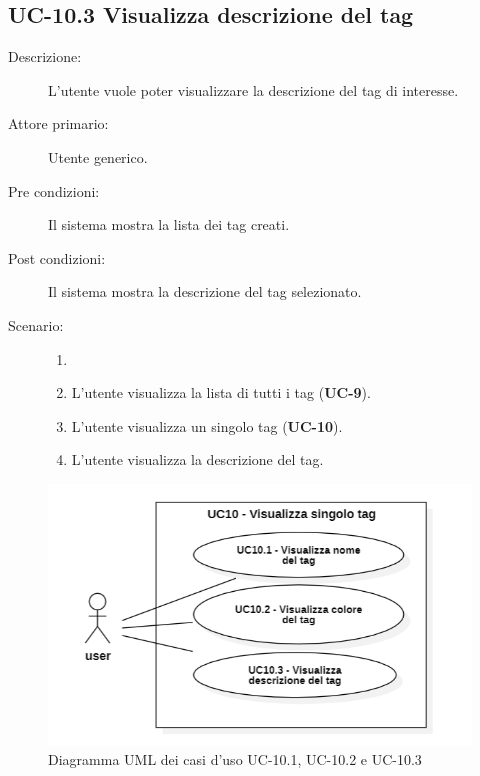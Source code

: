 \subsection{UC-10.3 Visualizza descrizione del tag}
\begin{description}
    \item[Descrizione:] L’utente vuole poter visualizzare la descrizione del tag di interesse.
    \item[Attore primario:] Utente generico.
    \item[Pre condizioni:] Il sistema mostra la lista dei tag creati.
    \item[Post condizioni:] Il sistema mostra la descrizione del tag selezionato.
    \item[Scenario:]
    \begin{enumerate}
        \item[]
        \item L’utente visualizza la lista di tutti i tag (\textbf{UC-9}).
        \item L'utente visualizza un singolo tag (\textbf{UC-10}).
        \item L'utente visualizza la descrizione del tag.
    \end{enumerate}
\end{description}

\begin{figure}[H]
    \centering
    \includegraphics[width=0.8\linewidth]{UC10.1.png}
    \caption{Diagramma UML dei casi d'uso UC-10.1, UC-10.2 e UC-10.3}
\end{figure}

